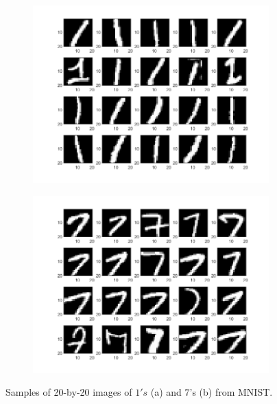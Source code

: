 \documentclass[12pt]{article}%
\begin{document}
\begin{figure}[H]
    \begin{subfigure}[b]{0.5\linewidth}
        \centering
        \includegraphics[width=\linewidth]{images/sample1.png}
        \caption{}
        \label{fig1:a}
        \vspace{4ex}
    \end{subfigure}%
    \begin{subfigure}[b]{0.5\linewidth}
        \centering
        \includegraphics[width=\linewidth]{images/sample7.png}
        \caption{}
        \label{fig1:b}
        \vspace{4ex}
    \end{subfigure}
    \caption{Samples of 20-by-20 images of $1's$ (a) and $7$'s (b) from MNIST.}
    \label{fig1}
\end{figure}
\end{document}
